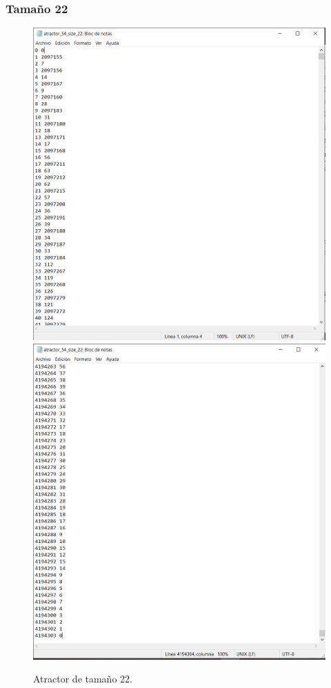 \documentclass[11pt]{article}
\begin{document}
			\subsubsection{Tamaño 22}
			\begin{figure}[H]
			\centering
			\includegraphics[scale=0.3]{resources/Atractores54/atractor_54_size_22.png}
			\includegraphics[scale=0.3]{resources/Atractores54/atractor_54_size_221.png}
			\caption{Atractor de tamaño 22.}\label{fig:picture}
			\end{figure}
\end{document}
